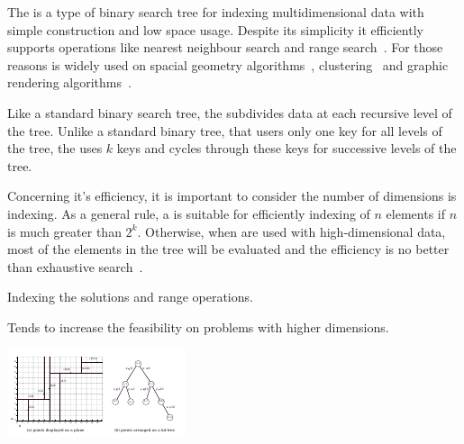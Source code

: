 The \kdtree{} is a type of binary search tree for indexing multidimensional
data with simple construction and low space usage.
Despite its simplicity it efficiently supports operations like nearest
neighbour search and range search~\cite{bentley1975}.
For those reasons \kdtree{} is widely used on
spacial geometry algorithms~\cite{preparata2012computational, guttman1984r},
clustering~\cite{kanungo2002efficient, indyk1998approximate}
and graphic rendering algorithms~\cite{owens2007survey}.

Like a standard binary search tree, the \kdtree{} subdivides data at each
recursive level of the tree.
Unlike a standard binary tree, that users only one key for all levels of the tree,
the \kdtree{} uses $k$ keys and cycles through these keys for successive levels
of the tree.


Concerning it's efficiency, it is important to consider the number of dimensions
\kdtree{} is indexing.
As a general rule, a \kdtree{} is suitable for efficiently indexing of $n$ elements
if $n$ is much greater than $2^k$.
Otherwise, when \kdtree{} are used with high-dimensional data, most of the elements
in the tree will be evaluated and the efficiency is no better than exhaustive search~\cite{toth2004handbook}.

Indexing the solutions and range operations.

Tends to increase the feasibility on problems with higher dimensions.

\includegraphics{src/imgs/dom-kd}

